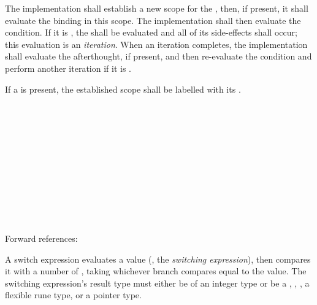 \specsubsubitem
The implementation shall establish a new scope for the
, then, if present, it shall evaluate the binding in
this scope. The implementation shall then evaluate the condition. If it is
, the  shall be evaluated and all of its
side-effects shall occur; this evaluation is an \textit{iteration}. When an
iteration completes, the implementation shall evaluate the afterthought, if
present, and then re-evaluate the condition and perform another iteration if it
is .

\specsubsubitem
If a  is present, the established scope shall be labelled
with its .


\begin{grammar}
 \\
	  \terminal{(}  \terminal{)} \terminal{\{}  \terminal{\}} \\

 \\
	  \\

 \\
	  \terminal{=>}  \\
	 \terminal{=>}  \\

 \\
	 \optional{\terminal{,}} \\
	 \terminal{,}  \\
\end{grammar}

Forward references: 

\specsubsubitem
A switch expression evaluates a value (, the
\textit{switching expression}), then compares it with a number of
, taking whichever branch compares equal to the value.
The switching expression's result type must either be of an integer type or be a
, , , a flexible rune type, or a
pointer type.

